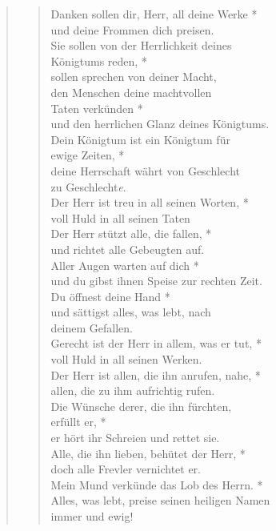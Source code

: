\vspace{0.3cm}
\begin{quote}
\begin{verse}


Danken sollen dir, Herr, all deine Werke *\\
 und deine Frommen dich preisen. \\
\vin Sie sollen von der Herrlichkeit deines \\ \vin Königtums reden, *\\
\vin sollen sprechen von deiner Macht, \\
den Menschen deine machtvollen \\Taten verkünden *\\
und den herrlichen Glanz deines Königtums. \\
\vin Dein Königtum ist ein Königtum für\\ \vin ewige Zeiten, *\\
\vin deine Herrschaft währt von Geschlecht\\ \vin zu Geschlecht\textit{e}.\\ 
 Der Herr ist treu in all seinen Worten, *\\ voll Huld in all seinen Taten\\
\vin Der Herr stützt alle, die fallen, *\\
\vin und richtet alle Gebeugten auf. \\
Aller Augen warten auf dich *\\
und du gibst ihnen Speise zur rechten Zeit. \\
\vin Du öffnest deine Hand *\\
\vin und sättigst alles, was lebt, nach\\ \vin deinem Gefallen. \\
Gerecht ist der Herr in allem, was er tut, *\\
voll Huld in all seinen Werken. \\
\vin Der Herr ist allen, die ihn anrufen, nahe, *\\
\vin allen, die zu ihm aufrichtig rufen. \\
Die Wünsche derer, die ihn fürchten,\\ erfüllt er, *\\
er hört ihr Schreien und rettet sie. \\
\vin Alle, die ihn lieben, behütet der Herr, *\\
\vin doch alle Frevler vernichtet er. \\
Mein Mund verkünde das Lob des Herrn. *\\
Alles, was lebt, preise seinen heiligen Namen \\immer und ewig! \\
\end{verse}

 \end{quote}